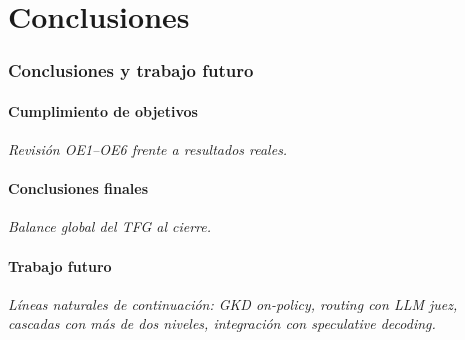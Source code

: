 \part{Conclusiones}
\label{part:conclusiones}

\section{Conclusiones y trabajo futuro}
\label{sec:conclusiones-futuro}

\subsection{Cumplimiento de objetivos}

\textit{Revisión OE1--OE6 frente a resultados reales.}

\subsection{Conclusiones finales}

\textit{Balance global del TFG al cierre.}

\subsection{Trabajo futuro}

\textit{Líneas naturales de continuación: GKD on-policy, routing con LLM juez, cascadas con más de dos niveles, integración con speculative decoding.}
